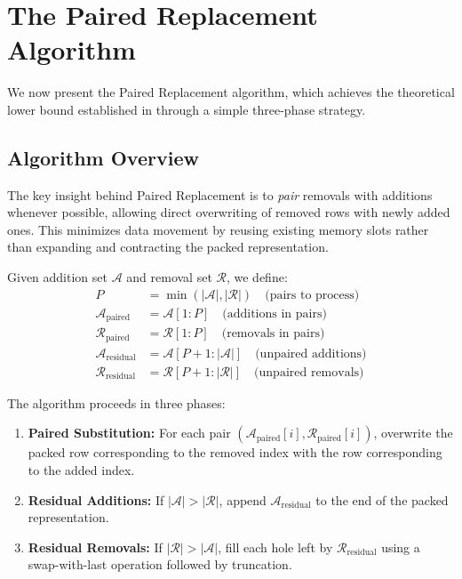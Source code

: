 \documentclass{article}
\numberwithin{equation}{section}
\theoremstyle{plain}
\theoremstyle{definition}
\theoremstyle{remark}
\begin{document}
\section{The Paired Replacement Algorithm} \label{sec:algorithm}

We now present the Paired Replacement algorithm, which achieves the theoretical lower bound established in  through a simple three-phase strategy.

\subsection{Algorithm Overview}

The key insight behind Paired Replacement is to \emph{pair} removals with additions whenever possible, allowing direct overwriting of removed rows with newly added ones. This minimizes data movement by reusing existing memory slots rather than expanding and contracting the packed representation.

Given addition set $\mathcal{A}$ and removal set $\mathcal{R}$, we define:
\begin{align}
P &= \min(|\mathcal{A}|, |\mathcal{R}|) \quad \text{(pairs to process)} \\
\mathcal{A}_{\text{paired}} &= \mathcal{A}[1:P] \quad \text{(additions in pairs)} \\
\mathcal{R}_{\text{paired}} &= \mathcal{R}[1:P] \quad \text{(removals in pairs)} \\
\mathcal{A}_{\text{residual}} &= \mathcal{A}[P+1:|\mathcal{A}|] \quad \text{(unpaired additions)} \\
\mathcal{R}_{\text{residual}} &= \mathcal{R}[P+1:|\mathcal{R}|] \quad \text{(unpaired removals)}
\end{align}

The algorithm proceeds in three phases:

\begin{enumerate}
    \item \textbf{Paired Substitution:} For each pair $(\mathcal{A}_{\text{paired}}[i], \mathcal{R}_{\text{paired}}[i])$, overwrite the packed row corresponding to the removed index with the row corresponding to the added index.
    
    \item \textbf{Residual Additions:} If $|\mathcal{A}| > |\mathcal{R}|$, append $\mathcal{A}_{\text{residual}}$ to the end of the packed representation.
    
    \item \textbf{Residual Removals:} If $|\mathcal{R}| > |\mathcal{A}|$, fill each hole left by $\mathcal{R}_{\text{residual}}$ using a swap-with-last operation followed by truncation.
\end{enumerate}
\end{document}
